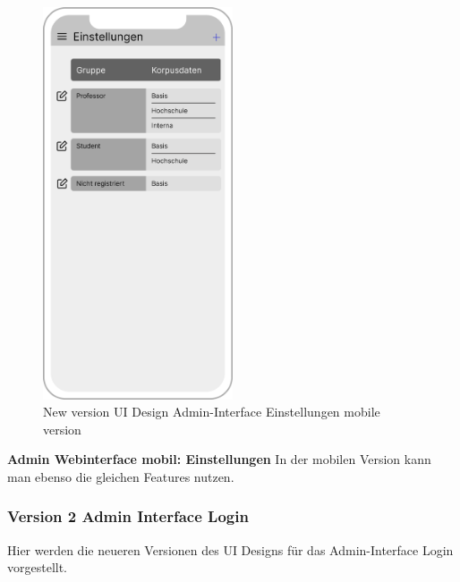 \begin{figure}[H]
    \centering
    \includegraphics[width=0.5\textwidth]{bilder/new vers. UI Design/Einstellungen/iPhone X Einstellungen I (1).png}
    \caption{New version UI Design Admin-Interface Einstellungen mobile version}
    \label{fig:New version UI Design Admin-Interface Einstellungen mobile version}
\end{figure}
\noindent \textbf{Admin Webinterface mobil: Einstellungen} \newline
In der mobilen Version kann man ebenso die gleichen Features nutzen.

\newpage

\subsubsection{Version 2 Admin Interface Login}
Hier werden die neueren Versionen des UI Designs für das Admin-Interface Login vorgestellt.

